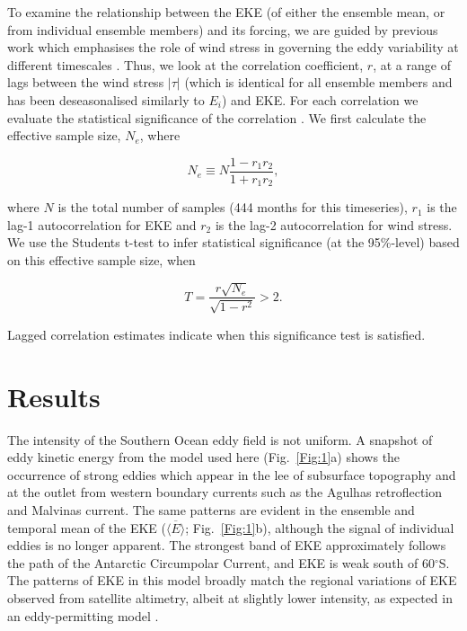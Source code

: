 \documentclass[linenumbers]{agujournal2019}
\begin{document}
To examine the relationship between the EKE (of either the ensemble mean, or from individual ensemble members) and its forcing, we are guided by previous work which emphasises the role of wind stress in governing the eddy variability at different timescales \citep[e.g.][]{Hogg2015, Sinha2016}.
Thus, we look at the correlation coefficient, $r$, at a range of lags between the wind stress $|\tau|$ (which is identical for all ensemble members and has been deseasonalised similarly to $E_i$) and EKE.
For each correlation we evaluate the statistical significance of the correlation \citep[following, e.g.][]{Santer2000}.
We first calculate the effective sample size, $N_e$, where
\begin{linenomath*}
\begin{equation}
N_e \equiv N \frac{1-r_1 r_2}{1+r_1 r_2},
\end{equation}
\end{linenomath*}
where $N$ is the total number of samples (444 months for this timeseries), $r_1$ is the lag-1 autocorrelation for EKE and $r_2$ is the lag-2 autocorrelation for wind stress.
We use the Students t-test to infer statistical significance (at the 95\%-level) based on this effective sample size, when
\begin{linenomath*}
\begin{equation}
T = \frac{r \sqrt{N_e}}{\sqrt{1-r^2}} > 2.
\end{equation}
\end{linenomath*}
Lagged correlation estimates indicate when this significance test is satisfied.

\section{Results}

The intensity of the Southern Ocean eddy field is not uniform.
A snapshot of eddy kinetic energy from the model used here (Fig.~\ref{Fig:1}a) shows the occurrence of strong eddies which appear in the lee of subsurface topography and at the outlet from western boundary currents such as the Agulhas retroflection and Malvinas current.
The same patterns are evident in the ensemble and temporal mean of the EKE ($\overline{\langle E \rangle}$; Fig.~\ref{Fig:1}b), although the signal of individual eddies is no longer apparent.
The strongest band of EKE approximately follows the path of the Antarctic Circumpolar Current, and EKE is weak south of 60$^\circ$S.
The patterns of EKE in this model broadly match the regional variations of EKE observed from satellite altimetry, albeit at slightly lower intensity, as expected in an eddy-permitting model \citep[e.g.][]{Kiss2020}.
\end{document}
